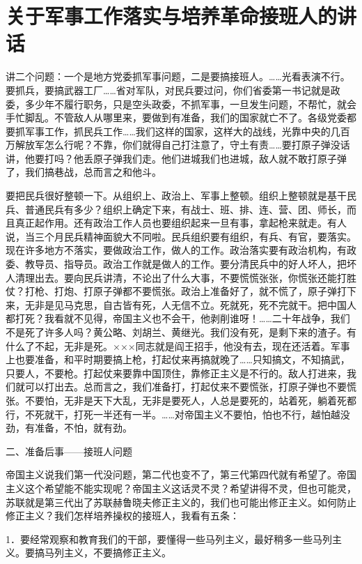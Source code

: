 \section[关于军事工作落实与培养革命接班人的讲话（一九六四年六月十六日于十三陵）]{关于军事工作落实与培养革命接班人的讲话}


讲二个问题：一个是地方党委抓军事问题，二是要搞接班人。……光看表演不行。要抓兵，要搞武器工厂……省对军队，对民兵要过问，你们省委第一书记就是政委，多少年不履行职务，只是空头政委，不抓军事，一旦发生问题，不帮忙，就会手忙脚乱。不管敌人从哪里来，要做到有准备，我们的国家就亡不了。各级党委都要抓军事工作，抓民兵工作……我们这样的国家，这样大的战线，光靠中央的几百万解放军怎么行呢？不靠，你们就得自己打注意了，守土有责……要打原子弹没话讲，他要打吗？他丢原子弹我们走。他们进城我们也进城，敌人就不敢打原子弹了，我们搞巷战，总而言之和他斗。

要把民兵很好整顿一下。从组织上、政治上、军事上整顿。组织上整顿就是基干民兵、普通民兵有多少？组织上确定下来，有战士、班、排、连、营、团、师长，而且真正起作用。还有政治工作人员也要组织起来一旦有事，拿起枪来就走。有人说，当三个月民兵精神面貌大不同啦。民兵组织要有组织，有兵、有官，要落实。现在许多地方不落实，要做政治工作，做人的工作。政治落实要有政治机构，有政委、教导员、指导员。政治工作就是做人的工作。要分清民兵中的好人坏人，把坏人清理出去。要向民兵讲清，不论出了什么大事，不要慌慌张张，你慌张还能打胜仗？打枪、打炮、打原子弹都不要慌张。政治上准备好了，就不慌了，原子弹打下来，无非是见马克思，自古皆有死，人无信不立。死就死，死不完就干。把中国人都打死？我看就不见得，帝国主义也不会干，他剥削谁呀！……二十年战争，我们不是死了许多人吗？黄公略、刘胡兰、黄继光。我们没有死，是剩下来的渣子。有什么了不起，无非是死。×××同志就是阎王招手，他没有去，现在还活着。军事上也要准备，和平时期要搞上枪，打起仗来再搞就晚了……只知搞文，不知搞武，只要人，不要枪。打起仗来要靠中国顶住，靠修正主义是不行的。敌人打进来，我们就可以打出去。总而言之，我们准备打，打起仗来不要慌张，打原子弹也不要慌张。不要怕，无非是天下大乱，无非是要死人，人总是要死的，站着死，躺着死都行，不死就干，打死一半还有一半。……对帝国主义不要怕，怕也不行，越怕越没劲，有准备，不怕，就有劲。

二、准备后事——接班人问题

帝国主义说我们第一代没问题，第二代也变不了，第三代第四代就有希望了。帝国主义这个希望能不能实现呢？帝国主义这话灵不灵？希望讲得不灵，但也可能灵，苏联就是第三代出了苏联赫鲁晓夫修正主义的，我们也可能出修正主义。如何防止修正主义？我们怎样培养操权的接班人，我看有五条：

1．要经常观察和教育我们的干部，要懂得一些马列主义，最好稍多一些马列主义。要搞马列主义，不要搞修正主义。

